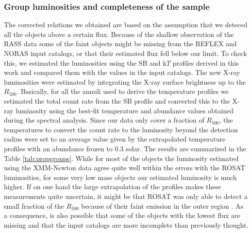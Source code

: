 \documentclass{aa} %
\begin{document}
\subsubsection{Group luminosities and completeness of the sample}
The corrected relations we obtained are based on the assumption that we deteced all the objects above a certain flux. Because of the shallow observation of the RASS data  some of the faint objects might be missing from the REFLEX and NORAS input catalogs, or that their estimated flux fell below our limit. To check this, we estimated the luminosities using the SB and k$T$ profiles derived in this work and compared them with the values in the input catalogs. The new X-ray luminosities were estimated by integrating the X-ray surface brightness up to the $R_{500}$. Basically, for all the annuli used to derive the temperature profiles we estimated the total count rate from the SB profile and converted this to the X-ray luminosity using the best-fit temperature and abundance values obtained during the spectral analysis. Since our data only cover a fraction of $R_{500}$, the temperatures to convert the count rate to the luminosity beyond the detection radius were set to an average value given by the extrapolated temperature profiles with  an abundance frozen to 0.3 solar. The results are summarized in the Table \ref{tab:propgroups}. While for most of the objects the luminosity estimated using the XMM-Newton data agree quite well within the errors with the ROSAT luminosities, for some very low mass objects our estimated luminosity is much higher. If on one hand the large extrapolation of the profiles makes these measurements quite uncertain, it might be that ROSAT was only able to detect a small fraction of the $R_{500}$ because of their faint emission in the outer region . As a consequence, is also possible that  some of the objects with the lowest flux are missing and that the input catalogs are more incomplete than previously thought.
\end{document}

